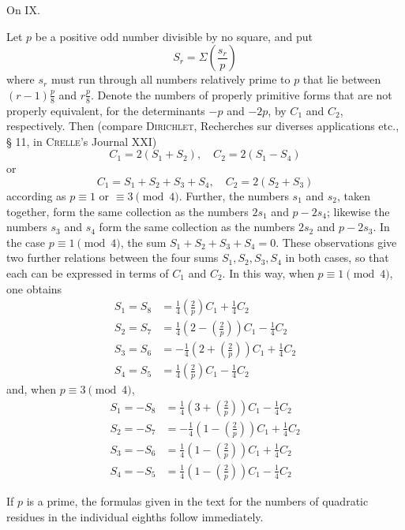 \begingroup
\setlength{\abovedisplayskip}{3pt plus 1pt minus 1pt}
\setlength{\belowdisplayskip}{3pt plus 1pt minus 1pt}
\setlength{\abovedisplayshortskip}{0pt plus 1pt}
\setlength{\belowdisplayshortskip}{3pt plus 1pt minus 1pt}
\begin{center}\large On IX.\end{center}

Let $p$ be a positive odd number divisible by no square, and put
\[
S_r=\Sigma\left(\frac{s_r}p\right)
\]
where $s_r$ must run through all numbers relatively prime to $p$ that lie between $(r-1)\frac p8$ and $r\frac p8$. Denote the numbers of properly primitive forms that are not properly equivalent, for the determinants $-p$ and $-2p$, by $C_1$ and $C_2$, respectively. Then (compare \textsc{Dirichlet}, Recherches sur diverses applications etc., § 11, in \textsc{Crelle}'s Journal XXI)
\[
C_1=2(S_1+S_2),\quad C_2=2(S_1-S_4)
\]
or
\[
C_1=S_1+S_2+S_3+S_4,\quad C_2=2(S_2+S_3)
\]
according as $p\equiv1$ or $\equiv3\pmod4$. Further, the numbers $s_1$ and $s_2$, taken together, form the same collection as the numbers $2s_1$ and $p-2s_4$; likewise the numbers $s_3$ and $s_4$ form the same collection as the numbers $2s_2$ and $p-2s_3$. In the case $p\equiv1\pmod4$, the sum $S_1+S_2+S_3+S_4=0$. These observations give two further relations between the four sums $S_1,S_2,S_3,S_4$ in both cases, so that each can be expressed in terms of $C_1$ and $C_2$. In this way, when $p\equiv1\pmod4$, one obtains
\[
\begin{aligned}
S_1=S_8&=\tfrac14\left(\frac2p\right)C_1+\tfrac14C_2\\
S_2=S_7&=\tfrac14\left(2-\left(\frac2p\right)\right)C_1-\tfrac14C_2\\
S_3=S_6&=-\tfrac14\left(2+\left(\frac2p\right)\right)C_1+\tfrac14C_2\\
S_4=S_5&=\tfrac14\left(\frac2p\right)C_1-\tfrac14C_2
\end{aligned}
\]
and, when $p\equiv3\pmod4$,
\[
\begin{aligned}
S_1=-S_8&=\tfrac14\left(3+\left(\frac2p\right)\right)C_1-\tfrac14C_2\\
S_2=-S_7&=-\tfrac14\left(1-\left(\frac2p\right)\right)C_1+\tfrac14C_2\\
S_3=-S_6&=\tfrac14\left(1-\left(\frac2p\right)\right)C_1+\tfrac14C_2\\
S_4=-S_5&=\tfrac14\left(1-\left(\frac2p\right)\right)C_1-\tfrac14C_2
\end{aligned}
\]

If $p$ is a prime, the formulas given in the text for the numbers of quadratic residues in the individual eighths follow immediately.
\BookRule{35mm}
\par\endgroup

